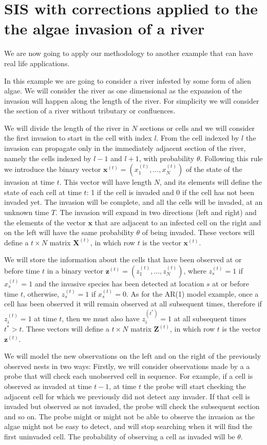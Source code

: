 \documentclass[11pt,a4paper]{article}
\renewcommand{\vec}[1]{\mathbf{#1}}
\begin{document}
\section{SIS with corrections applied to the the algae invasion of a river}

We are now going to apply our methodology to another example that can have real life applications. 

In this example we are going to consider a river infested by some form of alien algae. We will consider the river as one dimensional as the expansion of the invasion will happen along the length of the river. For simplicity we will consider the section of a river without tributary or confluences. 

We will divide the length of the river in $N$ sections or cells and we will consider the first invasion to start in the cell with index $l$.
From the cell indexed by $l$ the invasion can propagate only in the immediately adjacent section of the river, namely the cells indexed by $l-1$ and $l+1$, with probability $\theta$. Following this rule we introduce the binary vector $\vec{x}^{(t)} = (x_1^{(t)}, \dots, x_{N}^{(t)})$ of the state of the invasion at time $t$. This vector will have length $N$, and its elements will define the state of each cell at time $t$: 1 if the cell is invaded and 0 if the cell has not been invaded yet. The invasion will be complete, and all the cells will be invaded, at an unknown time $T$. 
The invasion will expand in two directions (left and right) and the elements of the vector $\vec{x}$ that are adjacent to an infected cell on the right and on the left will have the same probability $\theta$ of being invaded. These vectors will define a $t\times N$ matrix $\vec{X}^{(t)}$, in which row $t$ is the vector $\vec{x}^{(t)}$. 

We will store the information about the cells that have been observed at or before time $t$ in a binary vector $\vec{z}^{(t)} = (z_1^{(t)}, \dots, z_{N}^{(t)})$, where $z_s^{(t)} = 1$ if $x_s^{(t)} = 1$ and the invasive species has been detected at location $s$ at or before time $t$, otherwise, $z_s^{(t)} = 1$ if $x_s^{(t)} = 0$. As for the AR(1) model example, once a cell has been observed it will remain observed at all subsequent times, therefore if $z_i^{(t)} = 1$ at time $t$, then we must also have $z_i^{(t^{*})} = 1$ at all subsequent times $t^{*} > t$. These vectors will define a $t\times N$ matrix $\vec{Z}^{(t)}$, in which row $t$ is the vector $\vec{z}^{(t)}$.

We will model the new observations on the left and on the right of the previously observed nests in two ways: Firstly, we will consider observations made by a a probe that will check each unobserved cell in sequence. For example, if a cell is observed as invaded at time $t-1$, at time $t$ the probe will start checking the adjacent cell for which we previously did not detect any invader. If that cell is invaded but observed as not invaded, the probe will check the subsequent section and so on. The probe might or might not be able to observe the invasion as the algae might not be easy to detect, and will stop searching when it will find the first uninvaded cell. The probability of observing a cell as invaded will be $\theta$.
\end{document}
